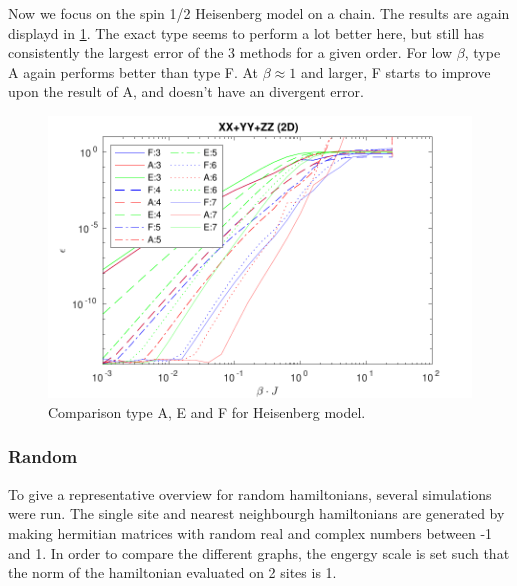 Now we focus on the spin 1/2 Heisenberg model on a chain. The results are again displayd in \cref{fig:benchmark:tHeisenberg}. The exact type seems to perform a lot better here, but still has consistently the largest error of the 3 methods for a given order. For low $\beta$, type A again performs better than type F. At $\beta \approx 1$ and larger, F starts to improve upon the result of A, and doesn't have an divergent error.

\begin{figure}
  \center
  \includegraphics[width=\textwidth]{Figuren/benchmarking/t_heis_XXX.pdf}
  \caption{Comparison type A, E and F for Heisenberg model.}
  \label{fig:benchmark:tHeisenberg}
\end{figure}

\subsubsection{Random}

To give a representative overview for random hamiltonians, several simulations were run. The single site and nearest neighbourgh hamiltonians are generated by making hermitian matrices with random real and complex numbers between -1 and 1. In order to compare the different graphs, the engergy scale is set such that the norm of the hamiltonian evaluated on 2 sites is 1.



